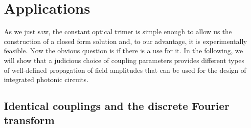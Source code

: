 \documentclass[9pt,twocolumn,twoside]{osajnl}
\begin{document}

\section{Applications}

As we just saw, the constant optical trimer is simple enough to allow us the construction of a closed form solution and, to our advantage, it is experimentally feasible.
Now the obvious question is if there is a use for it.
In the following, we will show that a judicious choice of coupling parameters provides  different types of well-defined propagation of field amplitudes that can be used for the design of integrated photonic circuits.


\subsection{Identical couplings and the discrete Fourier transform}
\end{document}
